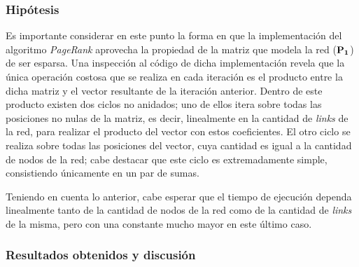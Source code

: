             \subsubsection*{Hipótesis}
            Es importante considerar en este punto la forma en que la implementación del algoritmo \emph{PageRank} aprovecha la propiedad de la matriz que modela la red ($\mathbf{P_1}$) de ser esparsa. Una inspección al código de dicha implementación revela que la única operación costosa que se realiza en cada iteración es  el producto entre la dicha matriz y el vector resultante de la iteración anterior. Dentro de este producto existen dos ciclos no anidados; uno de ellos itera sobre todas las posiciones no nulas de la matriz, es decir, linealmente en la cantidad de \emph{links} de la red, para realizar el producto del vector con estos coeficientes. El otro ciclo se realiza sobre todas las posiciones del vector, cuya cantidad es igual a la cantidad de nodos de la red; cabe destacar que este ciclo es extremadamente simple, consistiendo únicamente en un par de sumas.

            Teniendo en cuenta lo anterior, cabe esperar que el tiempo de ejecución dependa linealmente tanto de la cantidad de nodos de la red como de la cantidad de \emph{links} de la misma, pero con una constante mucho mayor en este último caso.

            \subsubsection*{Resultados obtenidos y discusión}

